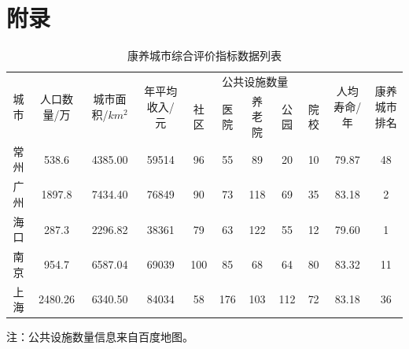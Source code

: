 \documentclass[12pt,a4paper]{article}
\begin{document}
\onecolumn
\newpage
\section*{附录}

\begin{table}[h]
  \centering
  \caption{康养城市综合评价指标数据列表}
  \begin{adjustbox}{width=\textwidth}
  \begin{tabular}{c|c|c|c|ccccc|c|c}
    \toprule[2pt]
    \multirow{2}{*}{城市} & \multirow{2}{*}{人口数量/万} & \multirow{2}{*}{城市面积/$km^2$}& \multirow{2}{*}{年平均收入/元}& \multicolumn{5}{c|}{公共设施数量} &\multirow{2}{*}{人均寿命/年}&\multirow{2}{*}{康养城市排名\cite{04}}\\
    \cline{5-9}
    & & & & 社区 & 医院 & 养老院 & 公园 & 院校 & &\\
    \midrule[1pt]
    常州 & 538.6 & 4385.00 &59514& 96 & 55 & 89 & 20 & 10 & 79.87 &48\\
    广州 & 1897.8 & 7434.40 &76849& 90 & 73 & 118 & 69 & 35 & 83.18 &2\\
    海口 & 287.3 & 2296.82 &38361& 79 & 63 & 122 & 55 & 12 & 79.60 &1\\
    南京 & 954.7 & 6587.04 &69039& 100 & 85 & 68 & 64 & 80 & 83.32 &11\\
    上海 & 2480.26 & 6340.50 &84034& 58 & 176 & 103 & 112 & 72 & 83.18 &36\\
    \bottomrule[2pt]
  \end{tabular}
  \end{adjustbox}

  \vspace{0.5em}
  {\footnotesize 注：公共设施数量信息来自百度地图。}
\end{table}
\end{document}
